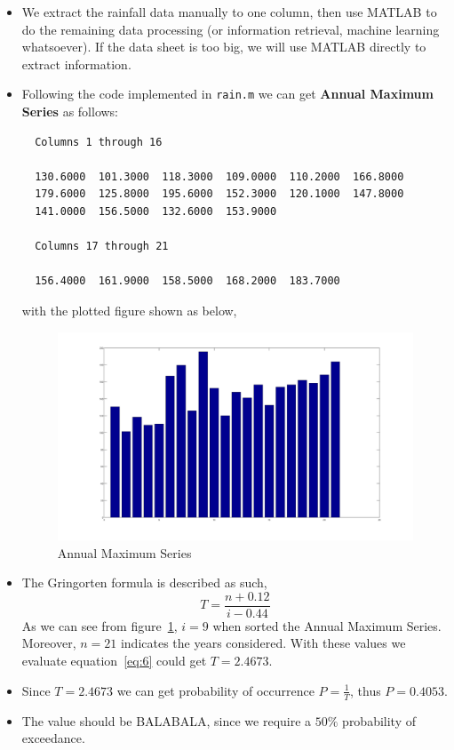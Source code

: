 \documentclass[12pt]{article}
\begin{document}
\begin{itemize}
\item We extract the rainfall data manually to one column, then use
  MATLAB to do the remaining data processing (or information
  retrieval, machine learning whatsoever). If the data sheet is too
  big, we will use MATLAB directly to extract information.
\item Following the code implemented in \texttt{rain.m} we can get
  \textbf{Annual Maximum Series} as follows:
\begin{verbatim}
  Columns 1 through 16

  130.6000  101.3000  118.3000  109.0000  110.2000  166.8000
  179.6000  125.8000  195.6000  152.3000  120.1000  147.8000
  141.0000  156.5000  132.6000  153.9000

  Columns 17 through 21

  156.4000  161.9000  158.5000  168.2000  183.7000
\end{verbatim}
  with the plotted figure shown as below,
  \begin{figure}
    \centering
    \includegraphics[scale=0.30]{annums_bar.png}
    \caption{Annual Maximum Series}
    \label{fig:rain-ams}
  \end{figure}

\item The Gringorten formula is described as such,
  \begin{equation}
    \label{eq:6}
    T=\frac{n+0.12}{i-0.44}
  \end{equation}
  As we can see from figure~\ref{fig:rain-ams}, $i=9$ when sorted the
  Annual Maximum Series. Moreover, $n=21$ indicates the years
  considered. With these values we evaluate equation~\eqref{eq:6}
  could get $T=2.4673$.
\item Since $T=2.4673$ we can get probability of occurrence
  $P=\frac{1}{T}$, thus $P=0.4053$.
\item The value should be BALABALA, since we require a $50\%$
  probability of exceedance.
\end{itemize}
\end{document}

